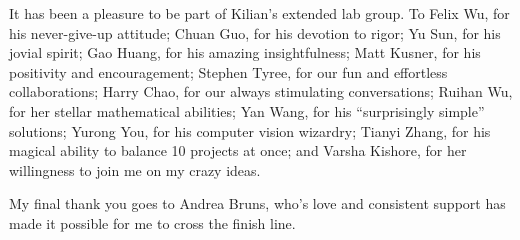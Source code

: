 It has been a pleasure to be part of Kilian's extended lab group.
To Felix Wu, for his never-give-up attitude; Chuan Guo, for his devotion to rigor; Yu Sun, for his jovial spirit; Gao Huang, for his amazing insightfulness;
Matt Kusner, for his positivity and encouragement; Stephen Tyree, for our fun and effortless collaborations;
Harry Chao, for our always stimulating conversations;
Ruihan Wu, for her stellar mathematical abilities;
Yan Wang, for his ``surprisingly simple'' solutions;
Yurong You, for his computer vision wizardry;
Tianyi Zhang, for his magical ability to balance 10 projects at once;
and Varsha Kishore, for her willingness to join me on my crazy ideas.

My final thank you goes to Andrea Bruns, who's love and consistent support has made it possible for me to cross the finish line.
